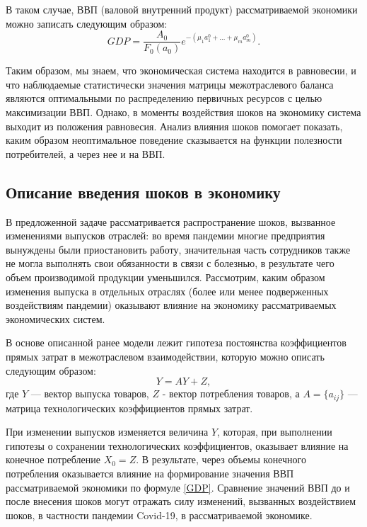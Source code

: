 \documentclass[12pt, a4paper]{article}
\begin{document}
В таком случае, ВВП (валовой внутренний продукт) рассматриваемой экономики можно записать следующим образом:
\begin{equation}\label{GDP}
GDP = \dfrac{A_0}{F_0(a_0)}e^{-(\mu_1a^0_{1}+\ldots+\mu_m a^0_m)}.
\end{equation}

Таким образом, мы знаем, что экономическая система находится в равновесии, и что наблюдаемые статистически значения матрицы межотраслевого баланса являются оптимальными по распределению первичных ресурсов с целью максимизации ВВП. Однако, в моменты воздействия шоков на экономику система выходит из положения равновесия. Анализ влияния шоков помогает показать, каким образом неоптимальное поведение сказывается на функции полезности потребителей, а через нее и на ВВП. 

\subsection{Описание введения шоков в экономику}
В предложенной задаче рассматривается распространение шоков, вызванное изменениями выпусков отраслей: во время пандемии многие предприятия вынуждены были приостановить работу, значительная часть сотрудников также не могла выполнять свои обязанности в связи с болезнью, в результате чего объем производимой продукции уменьшился. Рассмотрим, каким образом изменения выпуска в отдельных отраслях (более или менее подверженных воздействиям пандемии) оказывают влияние на экономику рассматриваемых экономических систем.

В основе описанной ранее модели лежит гипотеза постоянства коэффициентов прямых затрат в межотраслевом взаимодействии, которую можно описать следующим образом:
\begin{equation}\label{Leontev}
Y = AY + Z,
\end{equation}
где $Y$ --- вектор выпуска товаров, $Z$ - вектор потребления товаров, а $A = \{a_{ij}\}$ --- матрица технологических коэффициентов прямых затрат. 

При изменении выпусков изменяется величина $Y$, которая, при выполнении гипотезы о сохранении технологических коэффициентов, оказывает влияние на конечное потребление $X_0 = Z$. В результате, через объемы конечного потребления оказывается влияние на формирование значения ВВП рассматриваемой экономики по формуле \eqref{GDP}.
Сравнение значений ВВП до и после внесения шоков могут отражать силу изменений, вызванных воздействием шоков, в частности пандемии Covid-19, в рассматриваемой экономике.
\end{document}
